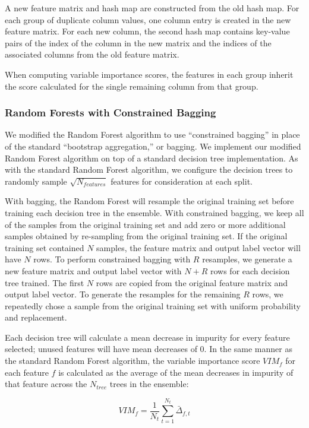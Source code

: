 A new feature matrix and hash map are constructed from the old hash map.  For each group of duplicate column values, one column entry is created in the new feature matrix.  For each new column, the second hash map contains key-value pairs of the index of the column in the new matrix and the indices of the associated columns from the old feature matrix.

When computing variable importance scores, the features in each group inherit the score calculated for the single remaining column from that group.

\subsubsection{Random Forests with Constrained Bagging}
We modified the Random Forest algorithm to use ``constrained bagging'' in place of the standard ``bootstrap aggregation,'' or bagging.  We implement our modified Random Forest algorithm on top of a standard decision tree implementation.  As with the standard Random Forest algorithm, we configure the decision trees to randomly sample $\sqrt{N_{features}}$ features for consideration at each split.

With bagging, the Random Forest will resample the original training set before training each decision tree in the ensemble.  With constrained bagging, we keep all of the samples from the original training set and add zero or more additional samples obtained by re-sampling from the original training set.  If the original training set contained $N$ samples, the feature matrix and output label vector will have $N$ rows.  To perform constrained bagging with $R$ resamples, we generate a new feature matrix and output label vector with $N + R$ rows for each decision tree trained.  The first $N$ rows are copied from the original feature matrix and output label vector.  To generate the resamples for the remaining $R$ rows, we repeatedly chose a sample from the original training set with uniform probability and replacement.

Each decision tree will calculate a mean decrease in impurity for every feature selected; unused features will have mean decreases of 0.  In the same manner as the standard Random Forest algorithm, the variable importance score $VIM_{f}$ for each feature $f$ is calculated as the average of the mean decreases in impurity of that feature across the $N_{tree}$ trees in the ensemble:

\[
VIM_f = \frac {1} {N_t} \sum_{t=1}^{N_t} \bar{\Delta}_{f, t}
\]

